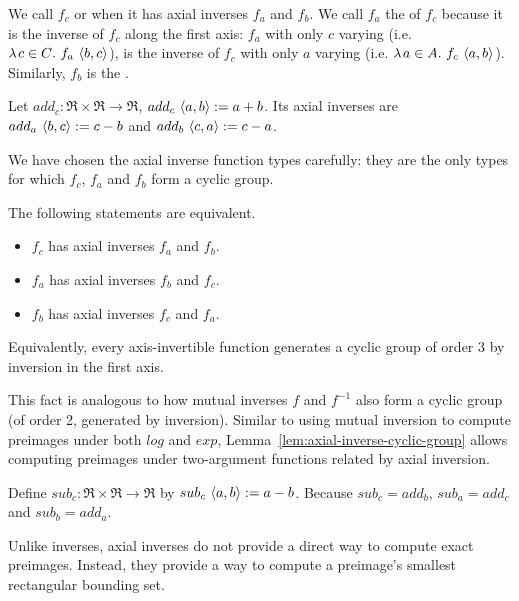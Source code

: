 We call $f_c$  or  when it has axial inverses $f_a$ and $f_b$.
We call $f_a$ the  of $f_c$ because it is the inverse of $f_c$ along the first axis: $f_a$ with only $c$ varying (i.e. $\lambda\mspace{2mu}{c \in C}\ldotp\, f_a~\langle{b,c}\rangle$), is the inverse of $f_c$ with only $a$ varying (i.e. $\lambda\mspace{2mu}{a \in A}\ldotp\, f_c~\langle{a,b}\rangle$).
Similarly, $f_b$ is the .

\begin{example}
\label{ex:plus-axial-inverses}
Let $add_c : \Re \times \Re \to \Re$, $add_c~\langle{a,b}\rangle := a+b$.
Its axial inverses are $add_a~\langle{b,c}\rangle := c - b$ and $add_b~\langle{c,a}\rangle := c - a$.
\exampleqed
\end{example}

We have chosen the axial inverse function types carefully: they are the only types for which $f_c$, $f_a$ and $f_b$ form a cyclic group.

\begin{lemma}
\label{lem:axial-inverse-cyclic-group}
The following statements are equivalent.
\begin{itemize}
	\item $f_c$ has axial inverses $f_a$ and $f_b$.
	\item $f_a$ has axial inverses $f_b$ and $f_c$.
	\item $f_b$ has axial inverses $f_c$ and $f_a$.
\end{itemize}
Equivalently, every axis-invertible function generates a cyclic group of order 3 by inversion in the first axis.
\end{lemma}

This fact is analogous to how mutual inverses $f$ and $f^{-1}$ also form a cyclic group (of order 2, generated by inversion).
Similar to using mutual inversion to compute preimages under both $log$ and $exp$, Lemma~\ref{lem:axial-inverse-cyclic-group} allows computing preimages under two-argument functions related by axial inversion.

\begin{example}
Define $sub_c : \Re \times \Re \to \Re$ by $sub_c~\langle{a,b}\rangle := a-b$.
Because $sub_c = add_b$, $sub_a = add_c$ and $sub_b = add_a$.
\exampleqed
\end{example}

Unlike inverses, axial inverses do not provide a direct way to compute exact preimages.
Instead, they provide a way to compute a preimage's smallest rectangular bounding set.

